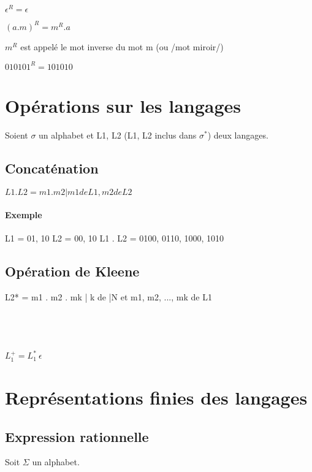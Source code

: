 \documentclass[12pt, a4paper]{report}
\begin{document}
{%
$\epsilon^{R} = \epsilon$

$(a .m)^{R} = m^{R} . a$

$m^R$ est appelé le 
mot inverse
%
du mot m (ou /mot miroir/) 

$010101^R = 101010$

\section{Opérations sur les langages}

Soient $\sigma$ un alphabet et L1, L2 (L1, L2 inclus dans $\sigma^{*}$)
deux langages.

\subsection{Concaténation}

$L1 . L2 = {m1 . m2 | m1 de L1, m2 de L2}$

\paragraph{Exemple}

L1 = {01, 10}
L2 = {00, 10}
L1 . L2 = {0100, 0110, 1000, 1010}


\subsection{Opération de Kleene}

L2* = { m1 . m2 . mk | k de |N et m1, m2, ..., mk de L1}

\subsection{~}

$L_1^{+} = L_1^{*} \ {\epsilon}$


\section{Représentations finies des langages}

\subsection{Expression rationnelle}

Soit $\Sigma$ un alphabet.

}
\end{document}
